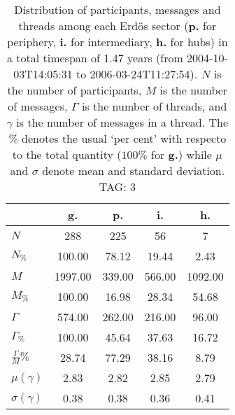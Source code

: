 \begin{table}[h!]
\begin{center}
\begin{tabular}{| l | c | c | c | c |}\hline
 & g. & p. & i. & h. \\\hline
$N$ & 288  & 225  & 56  & 7 \\\hline
$N_{\%}$ & 100.00  & 78.12  & 19.44  & 2.43 \\\hline
$M$ & 1997.00  & 339.00  & 566.00  & 1092.00 \\\hline
$M_{\%}$ & 100.00  & 16.98  & 28.34  & 54.68 \\\hline
$\Gamma$ & 574.00  & 262.00  & 216.00  & 96.00 \\\hline
$\Gamma_{\%}$ & 100.00  & 45.64  & 37.63  & 16.72 \\\hline
$\frac{\Gamma}{M}\%$ & 28.74  & 77.29  & 38.16  & 8.79 \\\hline
$\mu(\gamma)$ & 2.83  & 2.82  & 2.85  & 2.79 \\\hline
$\sigma(\gamma)$ & 0.38  & 0.38  & 0.36  & 0.41 \\\hline
\end{tabular}
\caption{Distribution of participants, messages and threads among each Erd\"os sector ({\bf p.} for periphery, {\bf i.} for intermediary, 
    {\bf h.} for hubs) in a total timespan of 1.47 years (from 2004-10-03T14:05:31 to 2006-03-24T11:27:54). $N$ is the number of participants, $M$ is the number of messages, $\Gamma$ is the number of threads, and $\gamma$ is the number of messages in a thread.
    The \% denotes the usual `per cent' with respecto to the total quantity ($100\%$ for {\bf g.})
    while $\mu$ and $\sigma$ denote mean and standard deviation. TAG: 3}
\end{center}
\end{table}